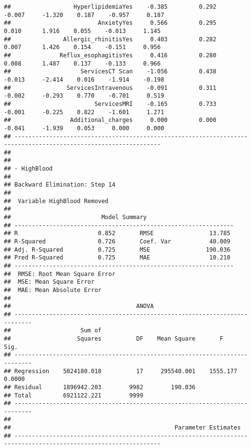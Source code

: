 \documentclass[
]{article}
\begin{document}
\begin{verbatim}
##                  HyperlipidemiaYes    -0.385         0.292       -0.007     -1.320    0.187    -0.957     0.187 
##                         AnxietyYes     0.566         0.295        0.010      1.916    0.055    -0.013     1.145 
##               Allergic_rhinitisYes     0.403         0.282        0.007      1.426    0.154    -0.151     0.956 
##              Reflux_esophagitisYes     0.416         0.280        0.008      1.487    0.137    -0.133     0.966 
##                    ServicesCT Scan    -1.056         0.438       -0.013     -2.414    0.016    -1.914    -0.198 
##                ServicesIntravenous    -0.091         0.311       -0.002     -0.293    0.770    -0.701     0.519 
##                        ServicesMRI    -0.165         0.733       -0.001     -0.225    0.822    -1.601     1.271 
##                 Additional_charges     0.000         0.000       -0.041     -1.939    0.053     0.000     0.000 
## ----------------------------------------------------------------------------------------------------------------
## 
## 
## - HighBlood 
## 
## Backward Elimination: Step 14 
## 
##  Variable HighBlood Removed 
## 
##                          Model Summary                          
## ---------------------------------------------------------------
## R                       0.852       RMSE                13.785 
## R-Squared               0.726       Coef. Var           40.009 
## Adj. R-Squared          0.725       MSE                190.036 
## Pred R-Squared          0.725       MAE                 10.210 
## ---------------------------------------------------------------
##  RMSE: Root Mean Square Error 
##  MSE: Mean Square Error 
##  MAE: Mean Absolute Error 
## 
##                                    ANOVA                                    
## ---------------------------------------------------------------------------
##                    Sum of                                                  
##                   Squares          DF    Mean Square       F          Sig. 
## ---------------------------------------------------------------------------
## Regression    5024180.018          17     295540.001    1555.177    0.0000 
## Residual      1896942.203        9982        190.036                       
## Total         6921122.221        9999                                      
## ---------------------------------------------------------------------------
## 
##                                               Parameter Estimates                                                
## ----------------------------------------------------------------------------------------------------------------

\end{verbatim}
\end{document}
